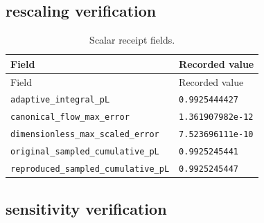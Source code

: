 
\subsection*{rescaling verification}

\begingroup\scriptsize
\setlength{\tabcolsep}{3pt}
\begin{longtable}{p{.46\linewidth}p{.46\linewidth}}
\caption{Scalar receipt fields.}\\
\toprule
Field & Recorded value \\
\midrule\endfirsthead
\toprule
Field & Recorded value \\
\midrule\endhead
\bottomrule\endfoot
\nolinkurl{adaptive_integral_pL} & \texttt{0.9925444427} \\
\nolinkurl{canonical_flow_max_error} & \texttt{1.361907982e-12} \\
\nolinkurl{dimensionless_max_scaled_error} & \texttt{7.523696111e-10} \\
\nolinkurl{original_sampled_cumulative_pL} & \texttt{0.9925245441} \\
\nolinkurl{reproduced_sampled_cumulative_pL} & \texttt{0.9925245447} \\
\end{longtable}
\endgroup



\subsection*{sensitivity verification}

